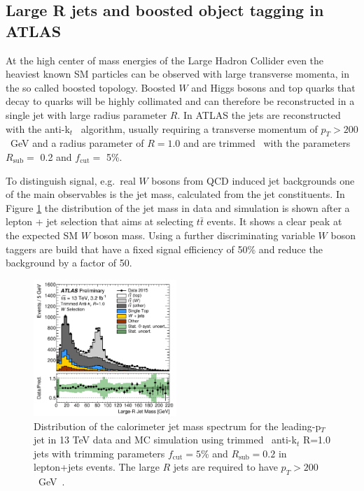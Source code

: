 \label{WG3}

\subsection{Large R jets and boosted object tagging in ATLAS}

At the high center of mass energies of the Large Hadron Collider even the heaviest known SM particles can be observed with large transverse momenta, in the so called boosted topology. Boosted $W$ and Higgs bosons and top quarks that decay to quarks will be highly collimated and can therefore be reconstructed in a single jet with large radius parameter $R$. In ATLAS the jets are reconstructed with the anti-k$_t$~\cite{Cacciari:2008gp} algorithm, usually requiring a transverse momentum of $p_T>200$~GeV and a radius parameter of $R=1.0$ and are trimmed~\cite{Krohn:2009th} with the parameters  $R_{\mathrm{sub}}=$ 0.2 and $f_{\mathrm{cut}}=$ 5\%. 

To distinguish signal, e.g.\ real $W$ bosons from QCD induced jet backgrounds one of the main observables is the jet mass, calculated from the jet constituents. In Figure \ref{fig:jetmass_W} the distribution of the jet mass in data and simulation is shown after a lepton + jet selection that aims at selecting $t\bar{t}$ events. It shows a clear peak at the expected SM $W$ boson mass. Using a further discriminating variable $W$ boson taggers are build that have a fixed signal efficiency of 50\% and reduce the background by a factor of 50.
\begin{figure}[!h]
\begin{centering}
\includegraphics[width=0.48\textwidth]{WG3_plots/fig_07}
\caption{Distribution of the calorimeter jet mass spectrum for the leading-p$_T$ jet in 13 TeV data and MC simulation using trimmed~\cite{Krohn:2009th} anti-k$_t$ R=1.0 jets with trimming parameters $f_{\mathrm{cut}}=5$\% and $R_{\mathrm{sub}} = 0.2$ in lepton+jets events. The large $R$ jets are required to have $p_T>200$~GeV~\cite{ATLASplots1}.}
\label{fig:jetmass_W}
\end{centering}
\end{figure}

